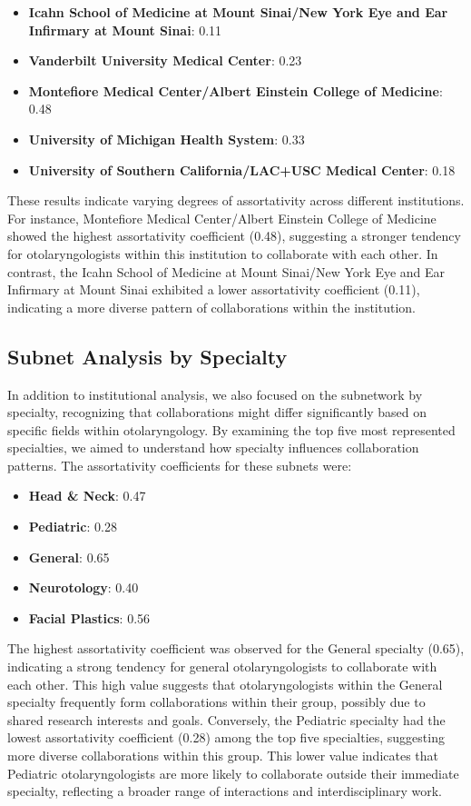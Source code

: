 \documentclass[12pt]{article}
\begin{document}
\begin{itemize}
    \item \textbf{Icahn School of Medicine at Mount Sinai/New York Eye and Ear Infirmary at Mount Sinai}: 0.11
    \item \textbf{Vanderbilt University Medical Center}: 0.23
    \item \textbf{Montefiore Medical Center/Albert Einstein College of Medicine}: 0.48
    \item \textbf{University of Michigan Health System}: 0.33
    \item \textbf{University of Southern California/LAC+USC Medical Center}: 0.18
\end{itemize}

These results indicate varying degrees of assortativity across different institutions. For instance, Montefiore Medical Center/Albert Einstein College of Medicine showed the highest assortativity coefficient (0.48), suggesting a stronger tendency for otolaryngologists within this institution to collaborate with each other. In contrast, the Icahn School of Medicine at Mount Sinai/New York Eye and Ear Infirmary at Mount Sinai exhibited a lower assortativity coefficient (0.11), indicating a more diverse pattern of collaborations within the institution.

\subsection{Subnet Analysis by Specialty}

In addition to institutional analysis, we also focused on the subnetwork by specialty, recognizing that collaborations might differ significantly based on specific fields within otolaryngology. By examining the top five most represented specialties, we aimed to understand how specialty influences collaboration patterns. The assortativity coefficients for these subnets were:

\begin{itemize}
    \item \textbf{Head \& Neck}: 0.47
    \item \textbf{Pediatric}: 0.28
    \item \textbf{General}: 0.65
    \item \textbf{Neurotology}: 0.40
    \item \textbf{Facial Plastics}: 0.56
\end{itemize}

The highest assortativity coefficient was observed for the General specialty (0.65), indicating a strong tendency for general otolaryngologists to collaborate with each other. This high value suggests that otolaryngologists within the General specialty frequently form collaborations within their group, possibly due to shared research interests and goals. Conversely, the Pediatric specialty had the lowest assortativity coefficient (0.28) among the top five specialties, suggesting more diverse collaborations within this group. This lower value indicates that Pediatric otolaryngologists are more likely to collaborate outside their immediate specialty, reflecting a broader range of interactions and interdisciplinary work.





\end{document}

